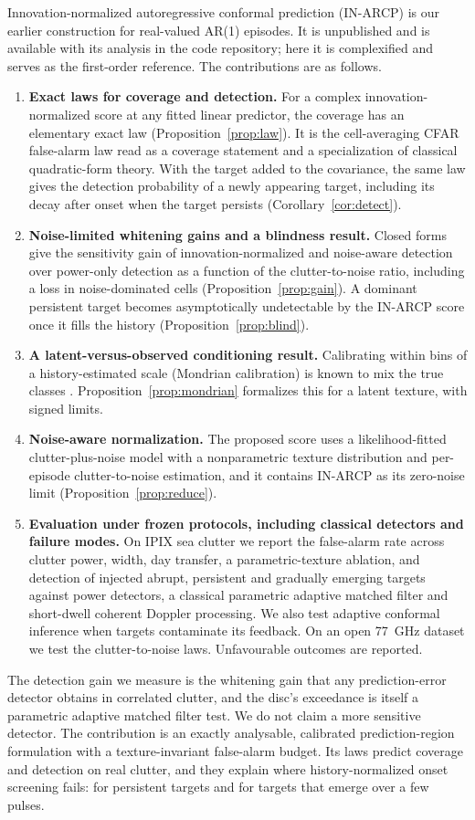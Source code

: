 \documentclass[journal]{IEEEtran}
\begin{document}
Innovation-normalized autoregressive conformal prediction (IN-ARCP) is our earlier construction for real-valued AR(1) episodes. It is unpublished and is available with its analysis in the code repository; here it is complexified and serves as the first-order reference. The contributions are as follows.
\begin{enumerate}[leftmargin=*,itemsep=2pt]
\item \textbf{Exact laws for coverage and detection.} For a complex innovation-normalized score at any fitted linear predictor, the coverage has an elementary exact law (Proposition~\ref{prop:law}). It is the cell-averaging CFAR false-alarm law read as a coverage statement and a specialization of classical quadratic-form theory. With the target added to the covariance, the same law gives the detection probability of a newly appearing target, including its decay after onset when the target persists (Corollary~\ref{cor:detect}).
\item \textbf{Noise-limited whitening gains and a blindness result.} Closed forms give the sensitivity gain of innovation-normalized and noise-aware detection over power-only detection as a function of the clutter-to-noise ratio, including a loss in noise-dominated cells (Proposition~\ref{prop:gain}). A dominant persistent target becomes asymptotically undetectable by the IN-ARCP score once it fills the history (Proposition~\ref{prop:blind}).
\item \textbf{A latent-versus-observed conditioning result.} Calibrating within bins of a history-estimated scale (Mondrian calibration) is known to mix the true classes \cite{dewolf2025}. Proposition~\ref{prop:mondrian} formalizes this for a latent texture, with signed limits.
\item \textbf{Noise-aware normalization.} The proposed score uses a likelihood-fitted clutter-plus-noise model with a nonparametric texture distribution and per-episode clutter-to-noise estimation, and it contains IN-ARCP as its zero-noise limit (Proposition~\ref{prop:reduce}).
\item \textbf{Evaluation under frozen protocols, including classical detectors and failure modes.} On IPIX sea clutter we report the false-alarm rate across clutter power, width, day transfer, a parametric-texture ablation, and detection of injected abrupt, persistent and gradually emerging targets against power detectors, a classical parametric adaptive matched filter and short-dwell coherent Doppler processing. We also test adaptive conformal inference when targets contaminate its feedback. On an open 77~GHz dataset we test the clutter-to-noise laws. Unfavourable outcomes are reported.
\end{enumerate}
The detection gain we measure is the whitening gain that any prediction-error detector obtains in correlated clutter, and the disc's exceedance is itself a parametric adaptive matched filter test. We do not claim a more sensitive detector. The contribution is an exactly analysable, calibrated prediction-region formulation with a texture-invariant false-alarm budget. Its laws predict coverage and detection on real clutter, and they explain where history-normalized onset screening fails: for persistent targets and for targets that emerge over a few pulses.
\end{document}
